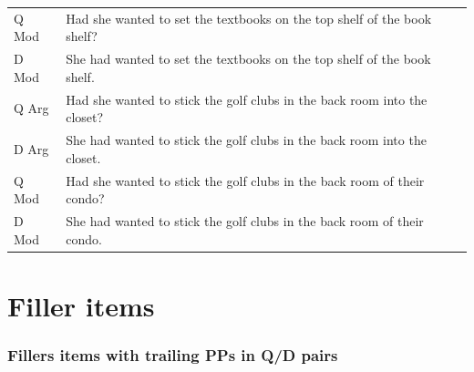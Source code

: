\documentclass[11pt,oneside]{book}
\begin{document}
\begin{longtable}{ll}
Q Mod & Had she wanted to set the textbooks on the top shelf of the book shelf?\\
D Mod & She had wanted to set the textbooks on the top shelf of the book shelf.\\
\addlinespace
Q Arg & Had she wanted to stick the golf clubs in the back room into the closet?\\
D Arg & She had wanted to stick the golf clubs in the back room into the closet.\\
Q Mod & Had she wanted to stick the golf clubs in the back room of their condo?\\
D Mod & She had wanted to stick the golf clubs in the back room of their condo.\\*
\end{longtable}

\newpage

\hypertarget{appFill}{%
\chapter{Filler items}\label{appFill}}

\hypertarget{fillers-items-with-trailing-pps-in-qd-pairs}{%
\subsection*{Fillers items with trailing PPs in Q/D pairs}\label{fillers-items-with-trailing-pps-in-qd-pairs}}
\end{document}
